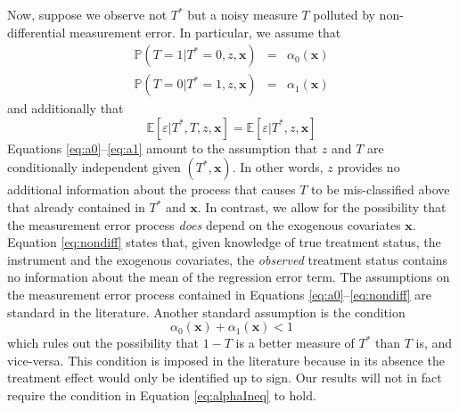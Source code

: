 Now, suppose we observe not $T^*$ but a noisy measure $T$ polluted by non-differential measurement error.
In particular, we assume that
\begin{eqnarray}
  \label{eq:a02}
  \mathbb{P}(T = 1| T^* = 0, z, \mathbf{x})  &=&  \alpha_0(\mathbf{x})\\
  \label{eq:a12}
  \mathbb{P}(T = 0| T^* = 1, z, \mathbf{x})  &=&  \alpha_1(\mathbf{x})
\end{eqnarray}
and additionally that
\begin{equation}
  \mathbb{E}[\varepsilon|T^*,T,z,\mathbf{x}] =  \mathbb{E}[\varepsilon|T^*,z,\mathbf{x}]
  \label{eq:nondiff2}
\end{equation}
Equations \ref{eq:a0}--\ref{eq:a1} amount to the assumption that $z$ and $T$ are conditionally independent given $(T^*,\mathbf{x})$. 
In other words, $z$ provides no additional information about the process that causes $T$ to be mis-classified above that already contained in $T^*$ and $\mathbf{x}$.
In contrast, we allow for the possibility that the measurement error process \emph{does} depend on the exogenous covariates $\mathbf{x}$. 
Equation \ref{eq:nondiff} states that, given knowledge of true treatment status, the instrument and the exogenous covariates, the \emph{observed} treatment status contains no information about the mean of the regression error term.  
The assumptions on the measurement error process contained in Equations \ref{eq:a0}--\ref{eq:nondiff} are standard in the literature.
Another standard assumption is the condition
\begin{equation}
  \alpha_0(\mathbf{x}) + \alpha_1(\mathbf{x}) < 1
  \label{eq:alphaIneq}
\end{equation}
which rules out the possibility that $1-T$ is a better measure of $T^*$ than $T$ is, and vice-versa.
This condition is imposed in the literature \citep{Mahajan,Lewbel,FL,BBS,KRS} because in its absence the treatment effect would only be identified up to sign.
Our results will not in fact require the condition in Equation \ref{eq:alphaIneq} to hold.



